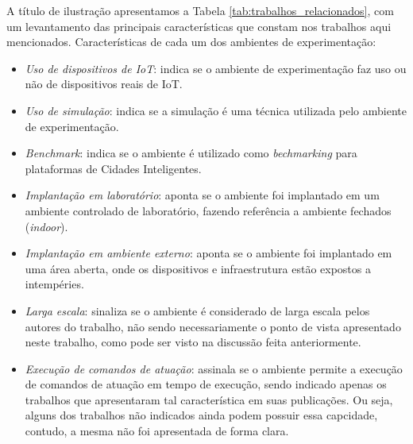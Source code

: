 A título de ilustração apresentamos a Tabela \ref{tab:trabalhos_relacionados}, com um levantamento das principais características que constam nos trabalhos aqui mencionados.
Características de cada um dos ambientes de experimentação:

\begin{itemize}
    \item \textit{Uso de dispositivos de IoT}: indica se o ambiente de experimentação faz uso ou não de dispositivos reais de IoT.

    \item \textit{Uso de simulação}: indica se a simulação é uma técnica utilizada pelo ambiente de experimentação.

    \item \textit{Benchmark}: indica se o ambiente é utilizado como \textit{bechmarking} para plataformas de Cidades Inteligentes.

    \item \textit{Implantação em laboratório}: aponta se o ambiente foi implantado em um ambiente controlado de laboratório, fazendo referência a ambiente fechados (\textit{indoor}).

    \item \textit{Implantação em ambiente externo}: aponta se o ambiente foi implantado em uma área aberta, onde os dispositivos e infraestrutura estão expostos a intempéries.

    \item \textit{Larga escala}: sinaliza se o ambiente é considerado de larga escala pelos autores do trabalho, não sendo necessariamente o ponto de vista apresentado neste trabalho, como pode ser
        visto na discussão feita anteriormente.

    \item \textit{Execução de comandos de atuação}: assinala se o ambiente permite a execução de comandos de atuação em tempo de execução, sendo indicado apenas os trabalhos que apresentaram tal
        característica em suas publicações. Ou seja, alguns dos trabalhos não indicados ainda podem possuir essa capcidade, contudo, a mesma não foi apresentada de forma clara.
\end{itemize}


